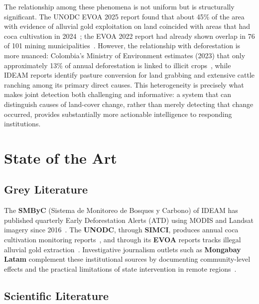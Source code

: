 \documentclass{article}
\begin{document}
The relationship among these phenomena is not uniform but is structurally
significant.
The UNODC EVOA 2025 report found that about 45\% of the area with evidence of
alluvial gold exploitation on land coincided with areas that had coca cultivation
in 2024~\cite{minenergia_evoa2025}; the EVOA 2022 report had already shown
overlap in 76 of 101 mining municipalities~\cite{unodc_evoa2022}.
However, the relationship with deforestation is more nuanced: Colombia's Ministry of Environment estimates
(2023) that only approximately 13\% of annual deforestation is linked to illicit crops~\cite{minambiente_13},
while IDEAM reports identify pasture conversion for land grabbing and extensive
cattle ranching among its primary direct causes.
This heterogeneity is precisely what makes joint detection both challenging and
informative: a system that can distinguish causes of land-cover change, rather
than merely detecting that change occurred, provides substantially more actionable
intelligence to responding institutions.


\section{State of the Art}
\label{sec:sota}

\subsection{Grey Literature}

The \textbf{SMByC} (Sistema de Monitoreo de Bosques y Carbono) of IDEAM has
published quarterly Early Deforestation Alerts (ATD) using MODIS and Landsat
imagery since 2016~\cite{ideam_smbyc,smbyc_atd_github}.
The \textbf{UNODC}, through \textbf{SIMCI}, produces annual coca cultivation
monitoring reports~\cite{minjusticia_coca2023}, and through its \textbf{EVOA}
reports tracks illegal alluvial gold extraction~\cite{unodc_evoa2022}.
Investigative journalism outlets such as \textbf{Mongabay Latam} complement these
institutional sources by documenting community-level effects and the practical
limitations of state intervention in remote
regions~\cite{mongabay_siona2023,mongabay_riopure2026}.

\subsection{Scientific Literature}
\end{document}
